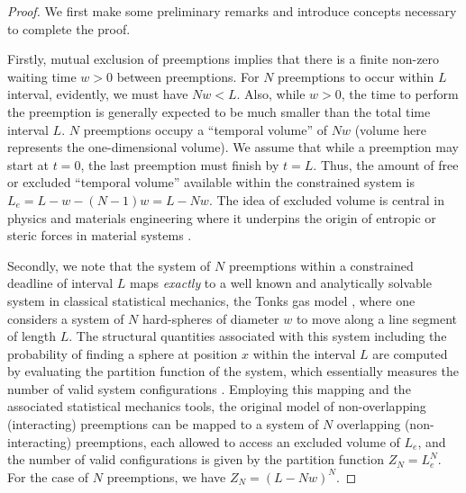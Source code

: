 \begin{proof}
We first make some preliminary remarks and introduce concepts necessary to complete the proof. 

Firstly, mutual exclusion of preemptions implies that there is a finite non-zero waiting time $w>0$ between preemptions. 
For $N$ preemptions to occur within $L$ interval, evidently, we must have $Nw < L$. Also, while $w >0$, the time to perform the preemption is generally expected to be much smaller than the total time interval $L$.
$N$ preemptions occupy a ``temporal volume'' of $Nw$ (volume here represents the one-dimensional volume). We assume that while a preemption may start at $t=0$, the last preemption must finish by $t = L$. Thus, the amount of free or excluded ``temporal volume'' available within the constrained system is $L_e = L - w - (N-1)w = L - Nw$.
The idea of excluded volume is central in physics and materials engineering where it underpins the origin of entropic or steric forces in material systems \cite{krauth2006statistical,jing2015ionic}. 

Secondly, we note that the system of $N$ preemptions within a constrained deadline of interval $L$ maps \emph{exactly} to a well known and analytically solvable system in classical statistical mechanics, the Tonks gas model \cite{tonks}, where one considers a system of $N$ hard-spheres of diameter $w$ to move along a line segment of length $L$. The structural quantities associated with this system including the probability of finding a sphere at position $x$ within the interval $L$ are computed by evaluating the partition function of the system, which essentially measures the number of valid system configurations \cite{krauth2006statistical}. Employing this mapping and the associated statistical mechanics tools, the original model of non-overlapping (interacting) preemptions can be mapped to a system of $N$ overlapping (non-interacting) preemptions, each allowed to access an excluded volume of $L_e$, and the number of valid configurations is given by the partition function $Z_N = L_e^N$. For the case of $N$ preemptions, we have $Z_N = (L- Nw)^N$.


\end{proof}
